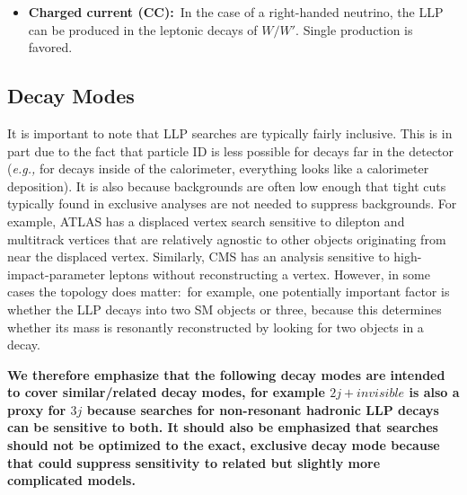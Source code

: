 \begin{itemize}
\item {\bf Charged current (CC):}~In the case of a right-handed neutrino, the LLP can be produced in the leptonic decays of $W/W'$. Single production is favored.
\end{itemize}

\subsection{Decay Modes}
It is important to note that LLP searches are typically fairly inclusive. This is in part due to the fact that particle ID is less possible for decays far in the detector (\emph{e.g.,} for decays inside of the calorimeter, everything looks like a calorimeter deposition). It is also because backgrounds are often low enough that tight cuts typically found in exclusive analyses are not needed to suppress backgrounds. For example, ATLAS has a displaced vertex search sensitive to dilepton and multitrack vertices that are relatively agnostic to other objects originating from near the displaced vertex. Similarly, CMS has an analysis sensitive to high-impact-parameter leptons without reconstructing a vertex.  However, in some cases the topology does matter:~for example, one potentially important factor is whether the LLP decays into two SM objects or three, because this determines whether its mass is resonantly reconstructed by looking for two objects in a decay. 

{\bf We therefore emphasize that the following decay modes are intended to cover similar/related decay modes, for example $2j+invisible$ is also a proxy for $3j$ because searches for non-resonant hadronic LLP decays can be sensitive to both. It should also be emphasized that searches should not be optimized to the exact, exclusive decay mode because that could suppress sensitivity to related but slightly more complicated models.}

